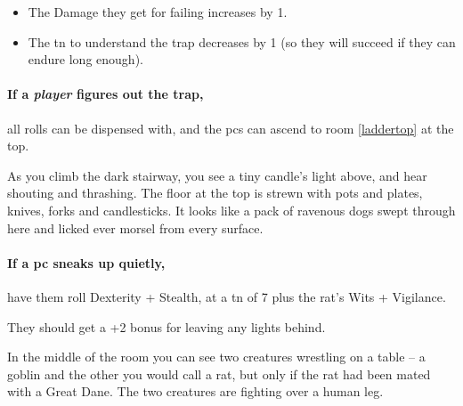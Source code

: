 \begin{multicols}{2}
\begin{itemize}
  \item
  The Damage they get for failing increases by 1.
  \item
  The \gls{tn} to understand the trap decreases by 1 (so they will succeed if they can endure long enough).

\end{itemize}

\paragraph{If a \emph{player} figures out the trap,}
all rolls can be dispensed with, and the \glspl{pc} can ascend to room \ref{laddertop} at the top.



\begin{boxtext}

  As you climb the dark stairway, you see a tiny candle's light above, and hear shouting and thrashing.
  The floor at the top is strewn with pots and plates, knives, forks and candlesticks.
  It looks like a pack of ravenous dogs swept through here and licked ever morsel from every surface.

\end{boxtext}

\paragraph{If a \gls{pc} sneaks up quietly,}
have them roll Dexterity + Stealth, at a \gls{tn} of 7 plus the rat's Wits + Vigilance.

They should get a +2 bonus for leaving any lights behind.

\begin{boxtext}

  In the middle of the room you can see two creatures wrestling on a table -- a goblin and the other you would call a rat, but only if the rat had been mated with a Great Dane.
  The two creatures are fighting over a human leg.


\end{boxtext}
\end{multicols}
